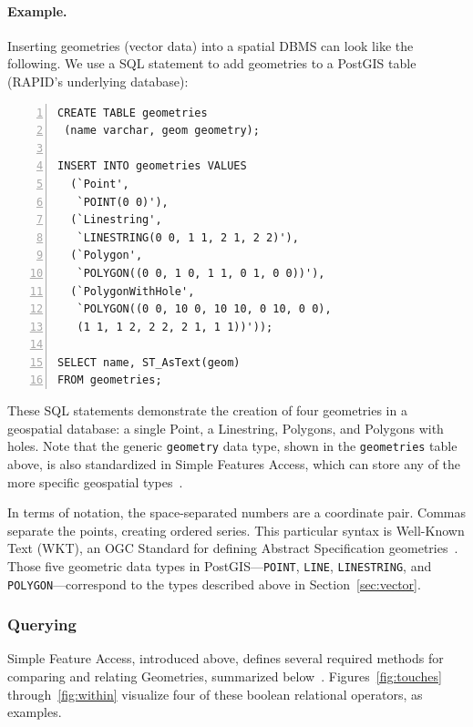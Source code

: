 \paragraph{Example.}
\label{background_wkt}
Inserting geometries (vector data) into a spatial DBMS can look like the following. We use a SQL statement to add geometries to a PostGIS table (RAPID's underlying database):

\begin{Verbatim}[samepage=true,baselinestretch=1,numbers=left,xleftmargin=12mm]
CREATE TABLE geometries
 (name varchar, geom geometry);

INSERT INTO geometries VALUES
  (`Point',
   `POINT(0 0)'),
  (`Linestring',
   `LINESTRING(0 0, 1 1, 2 1, 2 2)'),
  (`Polygon',
   `POLYGON((0 0, 1 0, 1 1, 0 1, 0 0))'),
  (`PolygonWithHole',
   `POLYGON((0 0, 10 0, 10 10, 0 10, 0 0),
   (1 1, 1 2, 2 2, 2 1, 1 1))'));

SELECT name, ST_AsText(geom)
FROM geometries;
\end{Verbatim}

These SQL statements demonstrate the creation of four geometries in a geospatial database: a single Point, a Linestring, Polygons, and Polygons with holes. Note that the generic \texttt{geometry} data type, shown in the \texttt{geometries} table above, is also standardized in Simple Features Access, which can store any of the more specific geospatial types~\cite{Boundless,SFA}.

In terms of notation, the space-separated numbers are a coordinate pair. Commas separate the points, creating ordered series. This particular syntax is Well-Known Text (WKT), an OGC Standard for defining Abstract Specification geometries~\cite{ogc}. Those five geometric data types in PostGIS---\texttt{POINT}, \texttt{LINE}, \texttt{LINESTRING}, and \texttt{POLYGON}---correspond to the types described above in Section~\ref{sec:vector}.

\subsubsection{Querying}
Simple Feature Access, introduced above, defines several required methods for comparing and relating Geometries, summarized below~\cite{SFA}. Figures~\ref{fig:touches} through~\ref{fig:within} visualize four of these boolean relational operators, as examples.



